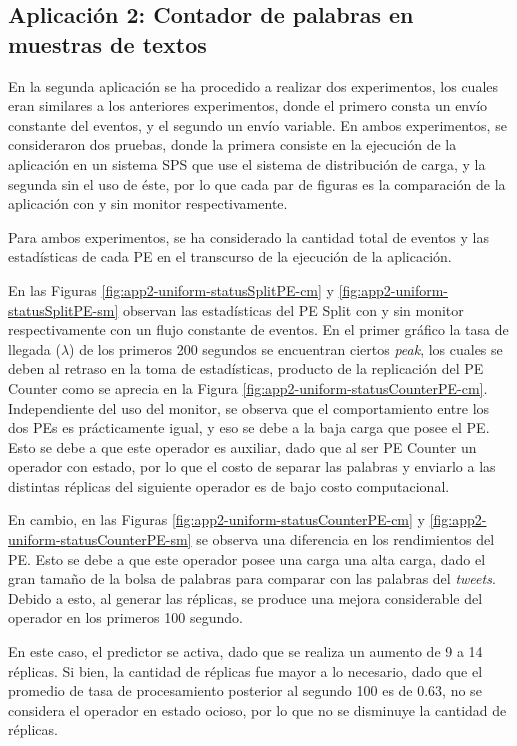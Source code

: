 \subsection{Aplicación 2: Contador de palabras en muestras de textos}
En la segunda aplicación se ha procedido a realizar dos experimentos, los cuales eran similares a los anteriores experimentos, donde el primero consta un envío constante del eventos, y el segundo un envío variable. En ambos experimentos, se consideraron dos pruebas, donde la primera consiste en la ejecución de la aplicación en un sistema SPS que use el sistema de distribución de carga, y la segunda sin el uso de éste, por lo que cada par de figuras es la comparación de la aplicación con y sin monitor respectivamente.

Para ambos experimentos, se ha considerado la cantidad total de eventos y las estadísticas de cada PE en el transcurso de la ejecución de la aplicación.

En las Figuras \ref{fig:app2-uniform-statusSplitPE-cm} y \ref{fig:app2-uniform-statusSplitPE-sm} observan las estadísticas del PE Split con y sin monitor respectivamente con un flujo constante de eventos. En el primer gráfico la tasa de llegada ($\lambda$) de los primeros 200 segundos se encuentran ciertos \textit{peak}, los cuales se deben al retraso en la toma de estadísticas, producto de la replicación del PE Counter como se aprecia en la Figura \ref{fig:app2-uniform-statusCounterPE-cm}. Independiente del uso del monitor, se observa que el comportamiento entre los dos PEs es prácticamente igual, y eso se debe a la baja carga que posee el PE. Esto se debe a que este operador es auxiliar, dado que al ser PE Counter un operador con estado, por lo que el costo de separar las palabras y enviarlo a las distintas réplicas del siguiente operador es de bajo costo computacional.

En cambio, en las Figuras \ref{fig:app2-uniform-statusCounterPE-cm} y \ref{fig:app2-uniform-statusCounterPE-sm} se observa una diferencia en los rendimientos del PE. Esto se debe a que este operador posee una carga una alta carga, dado el gran tamaño de la bolsa de palabras para comparar con las palabras del \textit{tweets}. Debido a esto, al generar las réplicas, se produce una mejora considerable del operador en los primeros 100 segundo.

En este caso, el predictor se activa, dado que se realiza un aumento de 9 a 14 réplicas. Si bien, la cantidad de réplicas fue mayor a lo necesario, dado que el promedio de tasa de procesamiento posterior al segundo 100 es de 0.63, no se considera el operador en estado ocioso, por lo que no se disminuye la cantidad de réplicas.

